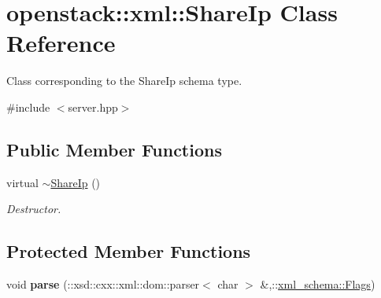 \hypertarget{classopenstack_1_1xml_1_1ShareIp}{
\section{openstack::xml::ShareIp Class Reference}
\label{classopenstack_1_1xml_1_1ShareIp}
}


Class corresponding to the ShareIp schema type.  




{\ttfamily \#include $<$server.hpp$>$}

\subsection*{Public Member Functions}
\begin{DoxyCompactItemize}
\item 
\hypertarget{classopenstack_1_1xml_1_1ShareIp_a93251cff8611b2abde801f278cfb6b2a}{
virtual \hyperlink{classopenstack_1_1xml_1_1ShareIp_a93251cff8611b2abde801f278cfb6b2a}{$\sim$ShareIp} ()}
\label{classopenstack_1_1xml_1_1ShareIp_a93251cff8611b2abde801f278cfb6b2a}

\begin{DoxyCompactList}\small\item\em Destructor. \item\end{DoxyCompactList}\end{DoxyCompactItemize}
\subsection*{Protected Member Functions}
\begin{DoxyCompactItemize}
\item 
\hypertarget{classopenstack_1_1xml_1_1ShareIp_ae34c0f351223523d60149037c0041bfa}{
void {\bfseries parse} (::xsd::cxx::xml::dom::parser$<$ char $>$ \&,::\hyperlink{namespacexml__schema_affb4c227cbd9aa7453dd1dc5a1401943}{xml\_\-schema::Flags})}
\label{classopenstack_1_1xml_1_1ShareIp_ae34c0f351223523d60149037c0041bfa}

\end{DoxyCompactItemize}
